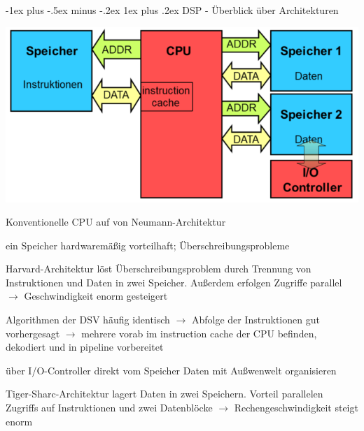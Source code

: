 \documentclass[a4paper]{article}
\makeatletter
\renewcommand{\subsubsection}{\@startsection{subsubsection}{3}{0mm}%
 {-1ex plus -.5ex minus -.2ex}%
 {1ex plus .2ex}%
 {\normalfont\small\bfseries}}
\makeatother
\begin{document}
\begin{multicols}{3}
  \subsubsection{DSP - Überblick über Architekturen}
  \begin{center}
    \includegraphics[width=.5\linewidth]{Assets/Biosignalverarbeitung-tiger-super-harvard.png}
  \end{center}
  \begin{itemize*}
    \item Konventionelle CPU auf von Neumann-Architektur
    \item ein Speicher hardwaremäßig vorteilhaft; Überschreibungsprobleme
    \item Harvard-Architektur löst Überschreibungsproblem durch Trennung von Instruktionen und Daten in zwei Speicher. Außerdem erfolgen Zugriffe parallel $\rightarrow$ Geschwindigkeit enorm gesteigert
    \item Algorithmen der DSV häufig identisch $\rightarrow$ Abfolge der Instruktionen gut vorhergesagt $\rightarrow$ mehrere vorab im instruction cache der CPU befinden, dekodiert und in pipeline vorbereitet
    \item über I/O-Controller direkt vom Speicher Daten mit Außwenwelt organisieren %
    \item Tiger-Sharc-Architektur lagert Daten in zwei Speichern. Vorteil parallelen Zugriffs auf Instruktionen und zwei Datenblöcke $\rightarrow$ Rechengeschwindigkeit steigt enorm
  \end{itemize*}


\end{multicols}
\end{document}
